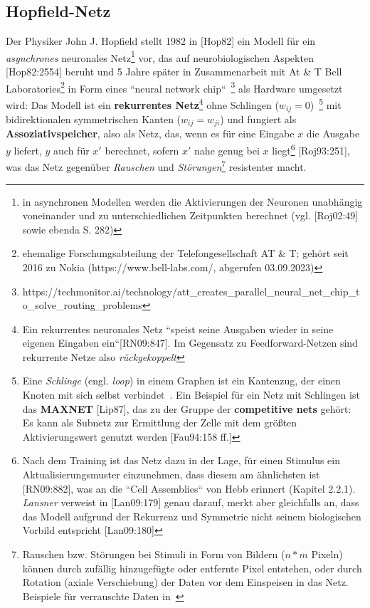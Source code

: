 \subsection{Hopfield-Netz}

Der Physiker John J. Hopfield stellt 1982 in [Hop82] ein Modell für ein \textit{asynchrones} neuronales Netz\footnote{
    in asynchronen Modellen werden die Aktivierungen der Neuronen unabhängig voneinander und zu unterschiedlichen Zeitpunkten berechnet (vgl. [Roj02:49] sowie ebenda S. 282)
}  vor, das auf neurobiologischen Aspekten [Hop82:2554] beruht und 5 Jahre später in Zusammenarbeit mit At & T Bell Laboratories\footnote{
    ehemalige Forschungsabteilung der Telefongesellschaft AT \& T;  gehört seit 2016 zu Nokia (https://www.bell-labs.com/, abgerufen 03.09.2023)
} in Form eines ``neural network chip``~\cite[457]{AR88}\footnote{
    https://techmonitor.ai/technology/att\_creates\_parallel\_neural\_net\_chip\_to\_solve\_routing\_problems
} als Hardware umgesetzt wird: Das Modell ist ein \textbf{rekurrentes Netz}\footnote{
Ein rekurrentes neuronales Netz ``speist seine Ausgaben wieder in seine eigenen Eingaben ein``[RN09:847]. Im Gegensatz zu Feedforward-Netzen sind rekurrente Netze also \textit{rückgekoppelt}
} ohne Schlingen ($w_{ij} = 0$)~\cite[291]{Ert21b}\footnote{ Eine \textit{Schlinge} (engl. \textit{loop}) in einem Graphen ist ein Kantenzug, der einen Knoten mit sich selbst verbindet~\cite[30]{Die17}. Ein Beispiel für ein Netz mit Schlingen ist das \textbf{MAXNET} [Lip87], das zu der Gruppe der \textbf{competitive nets} gehört: Es kann als Subnetz zur Ermittlung der Zelle mit dem größten Aktivierungswert genutzt werden [Fau94:158 ff.]
} mit bidirektionalen symmetrischen Kanten ($w_{ij} = w_{ji}$) und fungiert als \textbf{Assoziativspeicher}, also als Netz, das, wenn es für eine Eingabe $x$ die Ausgabe $y$ liefert, $y$ auch für $x'$ berechnet, sofern $x'$ nahe genug bei $x$ liegt\footnote{ Nach dem Training ist das Netz dazu in der Lage, für einen Stimulus ein Aktualisierungsmuster einzunehmen, dass diesem am ähnlichsten ist [RN09:882], was an die ``Cell Assemblies`` von Hebb erinnert (Kapitel 2.2.1). \textit{Lansner} verweist in [Lan09:179] genau darauf, merkt aber gleichfalls an, dass das Modell aufgrund der Rekurrenz und Symmetrie nicht seinem biologischen Vorbild entspricht [Lan09:180]
} [Roj93:251], was das Netz gegenüber \textit{Rauschen} und \textit{Störungen}\footnote{
    Rauschen bzw. Störungen bei Stimuli in Form von Bildern ($n * m$ Pixeln) können durch zufällig hinzugefügte oder entfernte Pixel entstehen, oder durch Rotation (axiale Verschiebung) der Daten vor dem Einspeisen in das Netz. Beispiele für verrauschte Daten in~\cite[294]{Ert21b}
} resistenter macht.
